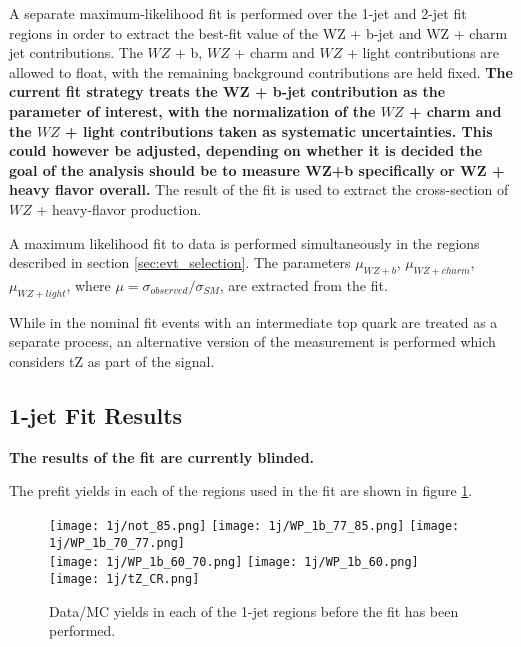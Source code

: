 
A separate maximum-likelihood fit is performed over the 1-jet and 2-jet fit regions in order to extract the best-fit value of the WZ + b-jet and WZ + charm jet contributions. The $WZ$ + b, $WZ$ + charm and $WZ$ + light contributions are allowed to float, with the remaining background contributions are held fixed. \textbf{The current fit strategy treats the WZ + b-jet contribution as the parameter of interest, with the normalization of the $WZ$ + charm and the $WZ$ + light contributions taken as systematic uncertainties. This could however be adjusted, depending on whether it is decided the goal of the analysis should be to measure WZ+b specifically or WZ + heavy flavor overall.} The result of the fit is used to extract the cross-section of $WZ$ + heavy-flavor production.

A maximum likelihood fit to data is performed simultaneously in the regions described in section \ref{sec:evt_selection}. The parameters $\mu_{WZ+b}$, $\mu_{WZ+charm}$, $\mu_{WZ+light}$, where $\mu = \sigma_{observed}/\sigma_{SM} $, are extracted from the fit.

While in the nominal fit events with an intermediate top quark are treated as a separate process, an alternative version of the measurement is performed which considers tZ as part of the signal.


\subsection{1-jet Fit Results}

\textbf{The results of the fit are currently blinded.} 

The prefit yields in each of the regions used in the fit are shown in figure \ref{fig:prefit_1j}.

\begin{figure}[H]
    \center
    \texttt{[image: 1j/not\_85.png]}%
    \texttt{[image: 1j/WP\_1b\_77\_85.png]}%
    \texttt{[image: 1j/WP\_1b\_70\_77.png]}\\
    \texttt{[image: 1j/WP\_1b\_60\_70.png]}%
    \texttt{[image: 1j/WP\_1b\_60.png]}%
    \texttt{[image: 1j/tZ\_CR.png]}\\
    \caption{Data/MC yields in each of the 1-jet regions before the fit has been performed.}
    \label{fig:prefit_1j}
\end{figure}

